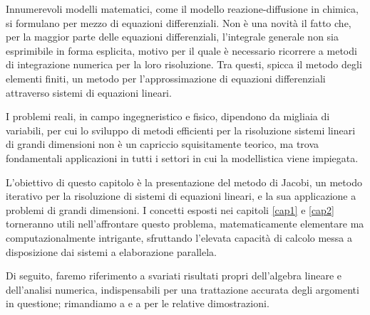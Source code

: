 Innumerevoli modelli matematici, come il modello reazione-diffusione in chimica, si formulano per mezzo di equazioni 
differenziali. \newline
Non \`e una novit\`a il fatto che, per la maggior parte delle equazioni differenziali, l'integrale generale non sia esprimibile in forma esplicita, motivo per il quale \`e 
necessario ricorrere a metodi di integrazione numerica per la loro risoluzione.\newline
Tra questi, spicca il metodo degli elementi finiti, un metodo per l'approssimazione di equazioni differenziali 
attraverso sistemi di equazioni lineari.

I problemi reali, in campo ingegneristico e fisico, dipendono da migliaia di variabili, per cui lo sviluppo di metodi efficienti per la risoluzione sistemi lineari di grandi 
dimensioni non \`e un capriccio squisitamente teorico, ma trova fondamentali applicazioni in tutti i settori in cui la modellistica viene impiegata.

L'obiettivo di questo capitolo \`e la presentazione del metodo di Jacobi, un metodo iterativo per la risoluzione di sistemi di equazioni lineari, e la sua 
applicazione a problemi di grandi dimensioni.\newline
I concetti esposti nei capitoli \ref{cap1} e \ref{cap2} torneranno utili nell'affrontare questo problema, matematicamente elementare ma computazionalmente 
intrigante, sfruttando l'elevata capacit\`a di calcolo messa a disposizione dai sistemi a elaborazione parallela.

Di seguito, faremo riferimento a svariati risultati propri dell'algebra lineare e dell'analisi numerica, indispensabili per una trattazione accurata degli 
argomenti in questione; rimandiamo a \cite{Betti2000} e a \cite{Quarteroni2000} per le relative dimostrazioni.